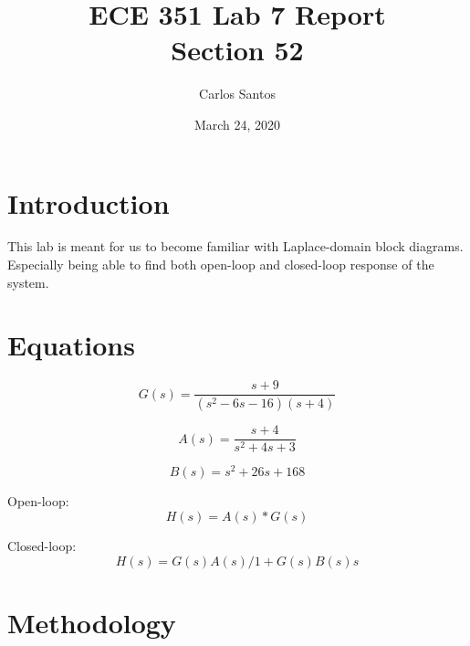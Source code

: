 \documentclass[12pt]{article}
\title{ECE 351 Lab 7 Report \\ Section 52}
\date{March 24, 2020}
\author{Carlos Santos}
\begin{document}
\maketitle
\tableofcontents

\vspace{\fill}
\maketitle
\vspace{\fill}
\clearpage

\section{Introduction}
This lab is meant for us to become familiar with Laplace-domain block diagrams. Especially being able to find both open-loop and closed-loop response of the system.

\section{Equations}

    \begin{equation}
        G(s) = \frac{s+9}{(s^2 - 6s - 16)(s+4)}
    \end{equation}
    
    \begin{equation}
        A(s) = \frac{s+4}{s^2 + 4s + 3}
    \end{equation}
    
    \begin{equation}
       B(s) = s^2 + 26s + 168 
    \end{equation}
    
    Open-loop:
    \begin{equation}
        H(s) = A(s) * G(s)
    \end{equation}
    
    Closed-loop:
    \begin{equation}
        H(s) = G(s)A(s) / 1 + G(s)B(s)s
    \end{equation}


\section{Methodology}
\end{document}
